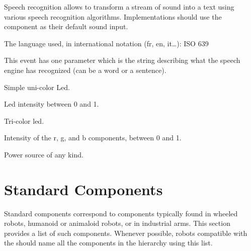 
Speech recognition allows to transform a stream of sound into a text
using various speech recognition algorithms. Implementations
should use the  component as their default sound input.

\begin{slots}
  {%
    The language used, in international notation (fr, en, it…): ISO
    639%
  }
\end{slots}

\begin{events}
  {%
    This event has one parameter which is the string describing what
    the speech engine has recognized (can be a word or a sentence).%
  }
\end{events}


Simple uni-color Led.

\begin{slots}
  {%
    Led intensity between 0 and 1.%
  }
\end{slots}



Tri-color led.

\begin{slots}
  {%
    Intensity of the r, g, and b components, between 0 and 1.%
  }
\end{slots}


Power source of any kind.

\begin{slots}
\end{slots}


\section{Standard Components}

Standard components correspond to components typically found in wheeled
robots, humanoid or animaloid robots, or in industrial arms. This section
provides a list of such components. Whenever possible, robots compatible with
the \gsrapi should name all the components in the hierarchy using this list.

